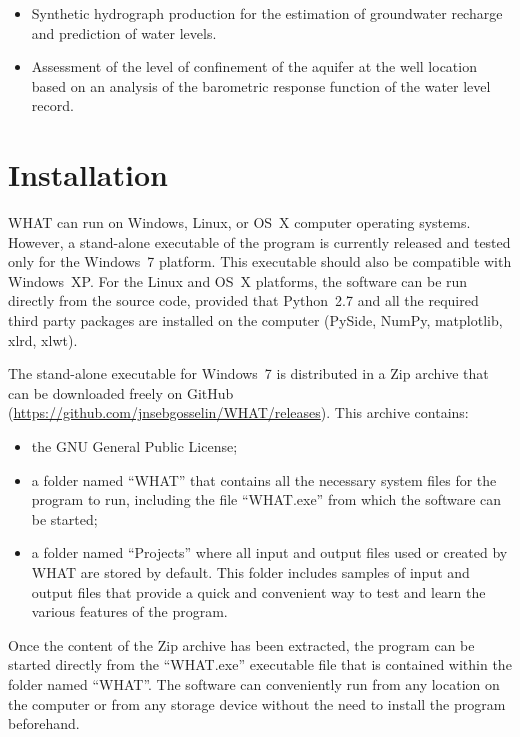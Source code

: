 \documentclass[WHATMANUAL.tex]{subfiles}
\begin{document}
\begin{itemize}

\item Synthetic hydrograph production for the estimation of groundwater recharge and prediction of water levels.

\item Assessment of the level of confinement of the aquifer at the well location based on an analysis of the barometric response function of the water level record.

\end{itemize}

\section{Installation}\label{sec:intallation}

WHAT can run on Windows, Linux, or OS~X computer operating systems. However, a stand-alone executable of the program is currently released and tested only for the Windows~7 platform. This executable should also be compatible with Windows~XP. For the Linux and OS~X platforms, the software can be run directly from the source code, provided that Python~2.7 and all the required third party packages are installed on the computer (PySide, NumPy, matplotlib, xlrd, xlwt).

The stand-alone executable for Windows~7 is distributed in a Zip archive that can be downloaded freely on GitHub (\url{https://github.com/jnsebgosselin/WHAT/releases}). This archive contains:

\begin{itemize}

\item the GNU General Public License;

\item a folder named ``WHAT'' that contains all the necessary system files for the program to run, including the file ``WHAT.exe'' from which the software can be started;

\item a folder named ``Projects'' where all input and output files used or created by WHAT are stored by default. This folder includes samples of input and output files that provide a quick and convenient way to test and learn the various features of the program.

\end{itemize}

Once the content of the Zip archive has been extracted, the program can be started directly from the ``WHAT.exe'' executable file that is contained within the folder named ``WHAT''. The software can conveniently run from any location on the computer or from any storage device without the need to install the program beforehand.
\end{document}
